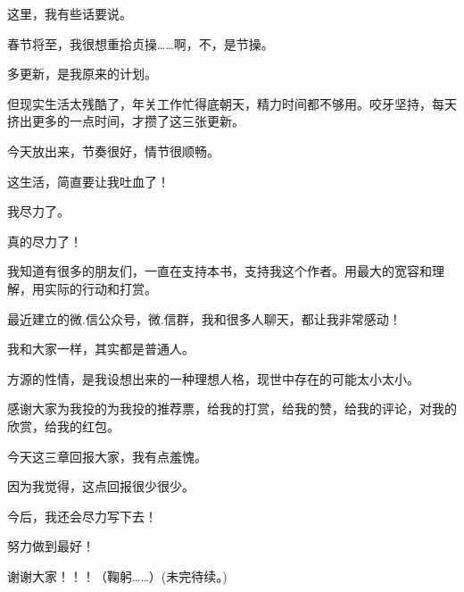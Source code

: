 \begin{this_body}
这里，我有些话要说。

春节将至，我很想重拾贞操……啊，不，是节操。

多更新，是我原来的计划。

但现实生活太残酷了，年关工作忙得底朝天，精力时间都不够用。咬牙坚持，每天挤出更多的一点时间，才攒了这三张更新。

今天放出来，节奏很好，情节很顺畅。

这生活，简直要让我吐血了！

我尽力了。

真的尽力了！

我知道有很多的朋友们，一直在支持本书，支持我这个作者。用最大的宽容和理解，用实际的行动和打赏。

最近建立的微.信公众号，微.信群，我和很多人聊天，都让我非常感动！

我和大家一样，其实都是普通人。

方源的性情，是我设想出来的一种理想人格，现世中存在的可能太小太小。

感谢大家为我投的为我投的推荐票，给我的打赏，给我的赞，给我的评论，对我的欣赏，给我的红包。

今天这三章回报大家，我有点羞愧。

因为我觉得，这点回报很少很少。

今后，我还会尽力写下去！

努力做到最好！

谢谢大家！！！（鞠躬……）(未完待续。)

\end{this_body}

